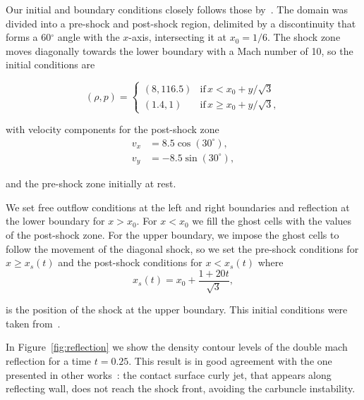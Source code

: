Our initial and boundary conditions closely follows those by~\citet{stone2008}. The domain was divided into a pre-shock and post-shock region, delimited by a discontinuity that forms a 60$^\circ$ angle with the $x$-axis, intersecting it at $x_0 = 1/6$. The shock zone moves diagonally towards the lower boundary with a Mach number of 10, so the initial conditions are

 \begin{equation}
     \left( \rho, p \right) = \left\lbrace
     \begin{array}{cl}
        (8,116.5) & \mathrm{if}\, x < x_0 + y/\sqrt{3} \\
        (1.4,1) &   \mathrm{if}\, x \geq x_0 + y/\sqrt{3},
     \end{array}
     \right.
 \end{equation}
 
\noindent with velocity components for the post-shock zone
\begin{equation}
    \begin{split}
        v_x &= 8.5 \cos(30^\circ), \\
        v_y &= -8.5 \sin(30^\circ),
    \end{split}
\end{equation}

\noindent and the pre-shock zone initially at rest.

We set free outflow conditions at the left and right boundaries and reflection at the lower boundary for $x > x_0$. For $x < x_0$ we fill the ghost cells with the values of the post-shock zone. For the upper boundary, we impose the ghost cells to follow the movement of the diagonal shock, so we set the pre-shock conditions for $x \geq x_s(t)$ and the post-shock conditions for $x < x_s(t)$ where
\begin{equation}
    x_s(t) = x_0 + \frac{1 + 20t}{\sqrt{3}},
\end{equation}

\noindent is the position of the shock at the upper boundary. This initial conditions were taken from~\citet{woodward1984}.

In Figure~\ref{fig:reflection} we show the density contour levels of the double mach reflection for a time $t = 0.25$. This result is in good agreement with the one presented in other works~\citep[e.g.][]{she2016}: the contact surface curly jet, that appears along reflecting wall, does not reach the shock front, avoiding the carbuncle instability. 





